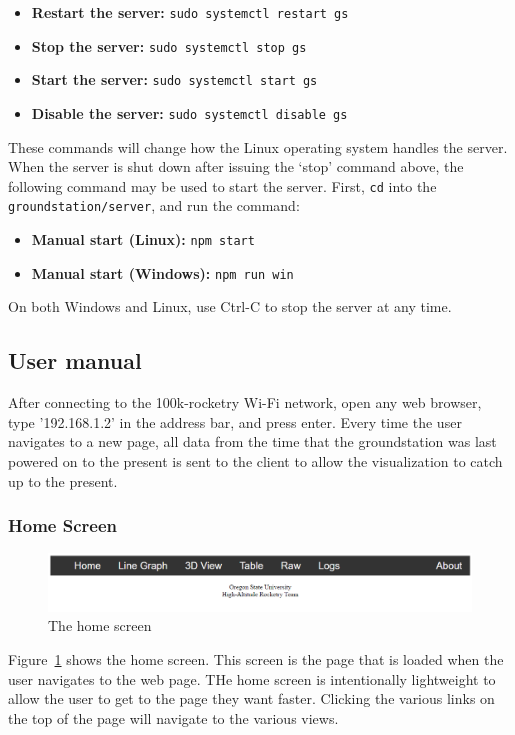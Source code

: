 \documentclass[10pt,draftclsnofoot,onecolumn]{IEEEtran}
\begin{document}
\begin{itemize}
\item\textbf{Restart the server:} \texttt{sudo systemctl restart gs}
\item\textbf{Stop the server:} \texttt{sudo systemctl stop gs}
\item\textbf{Start the server:} \texttt{sudo systemctl start gs}
\item\textbf{Disable the server:} \texttt{sudo systemctl disable gs}
\end{itemize}
These commands will change how the Linux operating system handles the server.
When the server is shut down after issuing the `stop' command above,
the following command may be used to start the server. First, \texttt{cd} into
the \texttt{groundstation/server}, and run the command:

\begin{itemize}
\item\textbf{Manual start (Linux):} \texttt{npm start}
\item\textbf{Manual start (Windows):} \texttt{npm run win}
\end{itemize}

On both Windows and Linux, use Ctrl-C to stop the server at any time.

\subsection{User manual}
After connecting to the 100k-rocketry Wi-Fi network, open any web browser, type '192.168.1.2'
in the address bar, and press enter.
Every time the user navigates to a new page, all data from the time that the groundstation was
last powered on to the present is sent to the client to allow the visualization to catch up
to the present.

\subsubsection{Home Screen}
	\begin{figure}[thbp!]
		\centering\includegraphics[width=170mm]{gs-header}
		\caption{The home screen}
		\label{gs-home}
	\end{figure}
	
Figure~\ref{gs-home} shows the home screen.
This screen is the page that is loaded when the user navigates to the web page.
THe home screen is intentionally lightweight to allow the user to get to
the page they want faster.
Clicking the various links on the top of the page will navigate to the various views.
\end{document}
